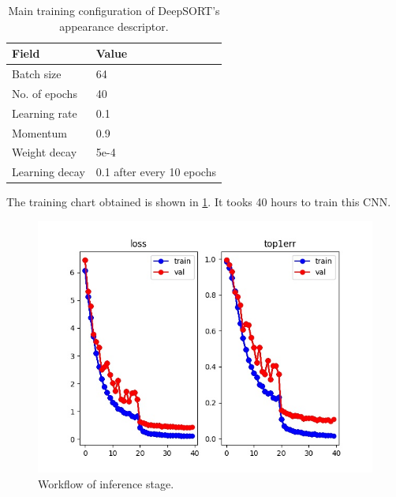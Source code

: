 \begin{table}	
	\label{tab:des}
	\begin{tabular}{|l|l|}
		
		\hline 
		Field & Value\\ 
		\hline 
		Batch size & 64 \\
		\hline
		No. of epochs & 40 \\
		\hline
		Learning rate & 0.1 \\
		\hline
		Momentum & 0.9 \\
		\hline
		Weight decay & 5e-4\\ 
		\hline
		Learning decay & 0.1 after every 10 epochs\\
		\hline
	\end{tabular} 
\caption{Main training configuration of DeepSORT’s appearance descriptor.}
\end{table}
The training chart obtained is shown in \ref{fig:descriptor}. It tooks 40 hours to train this CNN.
\begin{figure}[htbp]
	\centerline{\includegraphics[]{Figs/descriptor.jpg}}
	\caption{Workflow of inference stage.}
	\label{fig:descriptor}
\end{figure}
